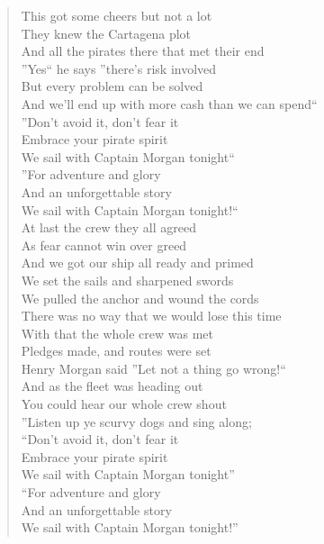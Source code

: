 \documentclass[11pt]{article}
\begin{document}
\begin{verse}
This got some cheers but not a lot\\
They knew the Cartagena plot\\
And all the pirates there that met their end\\
\vspace*{1em}
''Yes`` he says ''there's risk involved\\
But every problem can be solved\\
And we'll end up with more cash than we can spend``\\
''Don't avoid it, don't fear it\\
Embrace your pirate spirit\\
We sail with Captain Morgan tonight``\\
\vspace*{1em}
''For adventure and glory\\
And an unforgettable story\\
We sail with Captain Morgan tonight!``\\
\vspace*{1em}
At last the crew they all agreed\\
As fear cannot win over greed\\
And we got our ship all ready and primed\\
\vspace*{1em}
We set the sails and sharpened swords\\
We pulled the anchor and wound the cords\\
There was no way that we would lose this time\\
\vspace*{1em}
With that the whole crew was met\\
Pledges made, and routes were set\\
Henry Morgan said ''Let not a thing go wrong!``\\
\vspace*{1em}
And as the fleet was heading out\\
You could hear our whole crew shout\\
''Listen up ye scurvy dogs and sing along;\\
\vspace*{1em}
``Don't avoid it, don't fear it\\
Embrace your pirate spirit\\
We sail with Captain Morgan tonight''\\
``For adventure and glory\\
And an unforgettable story\\
We sail with Captain Morgan tonight!''\\
\end{verse}
\clearpage
\end{document}
